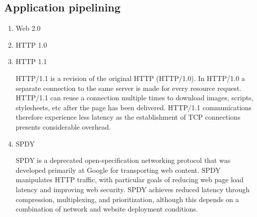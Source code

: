 \documentclass[twocolumn]{preport}
\begin{document}
\subsection{Application pipelining}
\begin{enumerate}
 \item Web 2.0\par
 \item HTTP 1.0\par
 \item HTTP 1.1\par
   HTTP/1.1 is a revision of the original HTTP (HTTP/1.0). In HTTP/1.0 a separate connection to the same server is made for every resource request. HTTP/1.1 can reuse a connection multiple times to download images, scripts, stylesheets, etc after the page has been delivered. HTTP/1.1 communications therefore experience less latency as the establishment of TCP connections presents considerable overhead.
 \item SPDY\par
   SPDY is a deprecated open-specification networking protocol that was developed primarily at Google for transporting web content. SPDY manipulates HTTP traffic, with particular goals of reducing web page load latency and improving web security. SPDY achieves reduced latency through compression, multiplexing, and prioritization, although this depends on a combination of network and website deployment conditions.
\end{enumerate}
\end{document}
